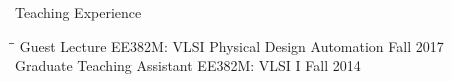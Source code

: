 \begin{rSection}{Teaching Experience}

\begin{tabbing}
\hspace{3.3in}\= \hspace{3.1in}\= \kill
Guest Lecture \> EE382M: VLSI Physical Design Automation \> Fall 2017 \\
Graduate Teaching Assistant \> EE382M: VLSI I \> Fall 2014 
\end{tabbing}

\end{rSection}
